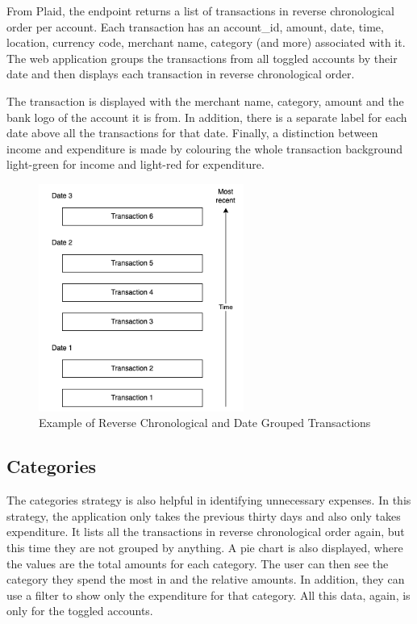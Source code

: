 From Plaid, the endpoint returns a list of transactions in reverse chronological order per account. Each transaction has an account\_id, amount, date, time, location, currency code, merchant name, category (and more) associated with it. The web application groups the transactions from all toggled accounts by their date and then displays each transaction in reverse chronological order.

The transaction is displayed with the merchant name, category, amount and the bank logo of the account it is from. In addition, there is a separate label for each date above all the transactions for that date. Finally, a distinction between income and expenditure is made by colouring the whole transaction background light-green for income and light-red for expenditure.

\begin{figure}[H]
	\centering
	\includegraphics[width=0.6\textwidth]{images/transaction_labels.png}
	\caption{Example of Reverse Chronological and Date Grouped Transactions}
	\label{fig:TransactionLabels}
\end{figure}

\subsection{Categories}
The categories strategy is also helpful in identifying unnecessary expenses. In this strategy, the application only takes the previous thirty days and also only takes expenditure. It lists all the transactions in reverse chronological order again, but this time they are not grouped by anything. A pie chart is also displayed, where the values are the total amounts for each category. The user can then see the category they spend the most in and the relative amounts. In addition, they can use a filter to show only the expenditure for that category. All this data, again, is only for the toggled accounts.

